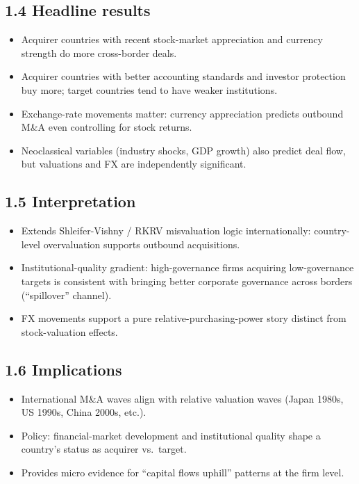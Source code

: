 \documentclass[11pt]{article}
\begin{document}
\subsection*{1.4 Headline results}
\begin{itemize}
\item Acquirer countries with recent stock-market appreciation and currency strength do more cross-border deals.
\item Acquirer countries with better accounting standards and investor protection buy more; target countries tend to have weaker institutions.
\item Exchange-rate movements matter: currency appreciation predicts outbound M\&A even controlling for stock returns.
\item Neoclassical variables (industry shocks, GDP growth) also predict deal flow, but valuations and FX are independently significant.
\end{itemize}

\subsection*{1.5 Interpretation}
\begin{itemize}
\item Extends Shleifer-Vishny / RKRV misvaluation logic internationally: country-level overvaluation supports outbound acquisitions.
\item Institutional-quality gradient: high-governance firms acquiring low-governance targets is consistent with bringing better corporate governance across borders (``spillover'' channel).
\item FX movements support a pure relative-purchasing-power story distinct from stock-valuation effects.
\end{itemize}

\subsection*{1.6 Implications}
\begin{itemize}
\item International M\&A waves align with relative valuation waves (Japan 1980s, US 1990s, China 2000s, etc.).
\item Policy: financial-market development and institutional quality shape a country's status as acquirer vs.\ target.
\item Provides micro evidence for ``capital flows uphill'' patterns at the firm level.
\end{itemize}
\end{document}
